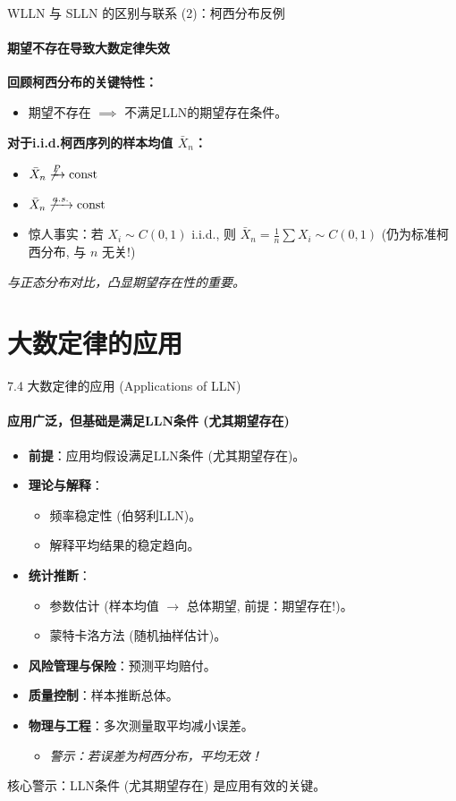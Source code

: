\documentclass[UTF8]{beamer}
\begin{document}
\begin{frame}{WLLN 与 SLLN 的区别与联系 (2)：柯西分布反例}
    \framesubtitle{期望不存在导致大数定律失效}
    \textbf{回顾柯西分布的关键特性：}
     \begin{itemize}
        \item 期望\alert{不存在} $\implies$ 不满足LLN的期望存在条件。
    \end{itemize}
    \pause
    \textbf{对于i.i.d.柯西序列的样本均值 $\bar{X}_n$：}
    \begin{itemize}
        \item $\bar{X}_n \not\xrightarrow{P} \text{const}$
        \item $\bar{X}_n \not\xrightarrow{a.s.} \text{const}$
        \item \alert{惊人事实}：若 $X_i \sim C(0,1)$ i.i.d., 则 $\bar{X}_n = \frac{1}{n} \sum X_i \sim C(0,1)$ (\alert{仍为标准柯西分布}, 与 $n$ 无关!)
    \end{itemize}
    \vspace{0.3cm}
    \textit{与正态分布对比，凸显期望存在性的重要。}
\end{frame}

\section{大数定律的应用}
\begin{frame}{7.4 大数定律的应用 (Applications of LLN)}
    \framesubtitle{应用广泛，但基础是满足LLN条件 (尤其期望存在)}
    \begin{itemize}
        \item \textbf{前提}：应用均假设满足LLN条件 (尤其\alert{期望存在})。
        \item \textbf{理论与解释}：
            \begin{itemize}
                \item \alert{频率稳定性} (伯努利LLN)。
                \item 解释平均结果的稳定趋向。
            \end{itemize}
        \item \textbf{统计推断}：
            \begin{itemize}
                \item \alert{参数估计} (样本均值 $\rightarrow$ 总体期望, \alert{前提：期望存在!})。
                \item \alert{蒙特卡洛方法} (随机抽样估计)。
            \end{itemize}
        \item \textbf{风险管理与保险}：预测平均赔付。
        \item \textbf{质量控制}：样本推断总体。
        \item \textbf{物理与工程}：多次测量取平均减小误差。
            \begin{itemize}
                \item \textit{警示：若误差为柯西分布，平均\alert{无效}！} 
            \end{itemize}
    \end{itemize}
    \vspace{0.2cm}
    \alert{核心警示}：LLN条件 (尤其期望存在) 是应用有效的关键。
\end{frame}
\end{document}
